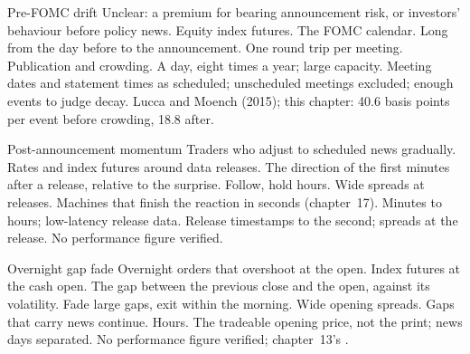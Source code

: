\begin{strategyfile}{Pre-FOMC drift}\label{strat:s1:short-term-futures-strategies:prefomc}
 Unclear: a premium for bearing announcement risk, or investors' behaviour before policy news.
 Equity index futures.
 The FOMC calendar.
 Long from the day before to the announcement.
 One round trip per meeting.
 Publication and crowding.
 A day, eight times a year; large capacity.
 Meeting dates and statement times as scheduled; unscheduled meetings excluded; enough events to judge decay.
 Lucca and Moench (2015); this chapter: 40.6 basis points per event before crowding, 18.8 after.
\end{strategyfile}

\begin{strategyfile}{Post-announcement momentum}\label{strat:s1:short-term-futures-strategies:post}
 Traders who adjust to scheduled news gradually.
 Rates and index futures around data releases.
 The direction of the first minutes after a release, relative to the surprise.
 Follow, hold hours.
 Wide spreads at releases.
 Machines that finish the reaction in seconds (chapter~17).
 Minutes to hours; low-latency release data.
 Release timestamps to the second; spreads at the release.
 No performance figure verified.
\end{strategyfile}

\begin{strategyfile}{Overnight gap fade}\label{strat:s1:short-term-futures-strategies:gap}
 Overnight orders that overshoot at the open.
 Index futures at the cash open.
 The gap between the previous close and the open, against its volatility.
 Fade large gaps, exit within the morning.
 Wide opening spreads.
 Gaps that carry news continue.
 Hours.
 The tradeable opening price, not the print; news days separated.
 No performance figure verified; chapter~13's .
\end{strategyfile}

